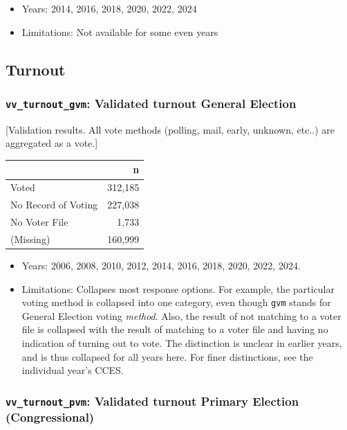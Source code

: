 \documentclass[10pt,article,oneside]{memoir}
\begin{document}
\begin{itemize}
\tightlist
\item
  Years: 2014, 2016, 2018, 2020, 2022, 2024
\item
  Limitations: Not available for some even years
\end{itemize}

\subsection{Turnout}\label{turnout}

\subsubsection{\texorpdfstring{\texttt{vv\_turnout\_gvm}: Validated
turnout General
Election}{vv\_turnout\_gvm: Validated turnout General Election}}\label{vv_turnout_gvm-validated-turnout-general-election}

{[}Validation results. All vote methods (polling, mail, early, unknown,
etc..) are aggregated as a vote.{]}

\begin{table}[H]
\centering
\begin{tabular}[t]{lr}
\toprule
 & n\\
\midrule
Voted & 312,185\\
No Record of Voting & 227,038\\
No Voter File & 1,733\\
(Missing) & 160,999\\
\bottomrule
\end{tabular}
\end{table}

\begin{itemize}
\tightlist
\item
  Years: 2006, 2008, 2010, 2012, 2014, 2016, 2018, 2020, 2022, 2024.
\item
  Limitations: Collapses most response options. For example, the
  particular voting method is collapsed into one category, even though
  \texttt{gvm} stands for General Election voting \emph{method}. Also,
  the result of not matching to a voter file is collapsed with the
  result of matching to a voter file and having no indication of turning
  out to vote. The distinction is unclear in earlier years, and is thus
  collapsed for all years here. For finer distinctions, see the
  individual year's CCES.
\end{itemize}

\subsubsection{\texorpdfstring{\texttt{vv\_turnout\_pvm}: Validated
turnout Primary Election
(Congressional)}{vv\_turnout\_pvm: Validated turnout Primary Election (Congressional)}}\label{vv_turnout_pvm-validated-turnout-primary-election-congressional}
\end{document}
